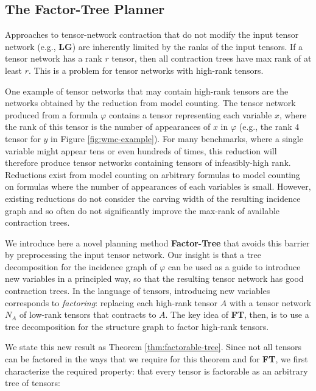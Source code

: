 \subsection{The Factor-Tree Planner}
\label{sec:tensors:preprocessing}
Approaches to tensor-network contraction that do not modify the input tensor network (e.g., \textbf{LG}) are inherently limited by the ranks of the input tensors. If a tensor network has a rank $r$ tensor, then all contraction trees have max rank of at least $r$. This is a problem for tensor networks with high-rank tensors. 

One example of tensor networks that may contain high-rank tensors are the networks obtained by the reduction from model counting. The tensor network produced from a formula $\varphi$ contains a tensor representing each variable $x$, where the rank of this tensor is the number of appearances of $x$ in $\varphi$ (e.g., the rank $4$ tensor for $y$ in Figure \ref{fig:wmc-example}). For many benchmarks, where a single variable might appear tens or even hundreds of times, this reduction will therefore produce tensor networks containing tensors of infeasibly-high rank. Reductions exist from model counting on arbitrary formulas to model counting on formulas where the number of appearances of each variables is small. However, existing reductions do not consider the carving width of the resulting incidence graph and so often do not significantly improve the max-rank of available contraction trees. 

We introduce here a novel planning method \textbf{Factor-Tree} that avoids this barrier by preprocessing the input tensor network. Our insight is that a tree decomposition for the incidence graph of $\varphi$ can be used as a guide to introduce new variables in a principled way, so that the resulting tensor network has good contraction trees. In the language of tensors, introducing new variables corresponds to \emph{factoring}: replacing each high-rank tensor $A$ with a tensor network $N_A$ of low-rank tensors that contracts to $A$. The key idea of \textbf{FT}, then, is to use a tree decomposition for the structure graph to factor high-rank tensors.

We state this new result as Theorem \ref{thm:factorable-tree}. Since not all tensors can be factored in the ways that we require for this theorem and for \textbf{FT}, we first characterize the required property: that every tensor is factorable as an arbitrary tree of tensors:


